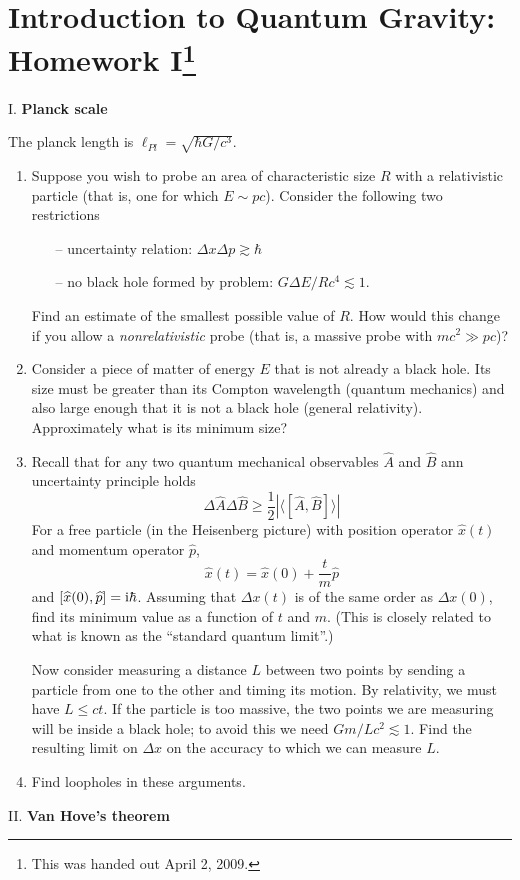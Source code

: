 \section[Homework I]{Introduction to Quantum Gravity: Homework I\footnote{This was handed out April 2, 2009.}}


I. \textbf{Planck scale}

The planck length is $\ell_{Pl} = \sqrt{\hbar G/c^{3}}$.
\begin{enumerate}[label=(\alph*),nosep]
\item Suppose you wish to probe an area of characteristic size $R$ with
  a relativistic particle (that is, one for which $E\sim pc$). Consider
  the following two restrictions
  \begin{itemize}
  \item[--] uncertainty relation: $\Delta x\Delta p\gtrsim\hbar$
  \item[--] no black hole formed by problem: $G\Delta E/R c^{4}\lesssim 1$.
  \end{itemize}
  Find an estimate of the smallest possible value of $R$. How would this
  change if you allow a \emph{nonrelativistic} probe (that is, a massive
  probe with $mc^{2}\gg pc$)?
\item Consider a piece of matter of energy $E$ that is not already a
  black hole. Its size must be greater than its Compton wavelength
  (quantum mechanics) and also large enough that it is not a black hole
  (general relativity). Approximately what is its minimum size?
\item Recall that for any two quantum mechanical observables
  $\widehat{A}$ and $\widehat{B}$ ann uncertainty principle holds
  \begin{equation*}
\Delta\widehat{A}\Delta\widehat{B}\geq\frac{1}{2}|\langle[\widehat{A},\widehat{B}]\rangle|
  \end{equation*}
  For a free particle (in the Heisenberg picture) with position operator
  $\widehat{x}(t)$ and momentum operator $\widehat{p}$,
  \begin{equation*}
    \widehat{x}(t) = \widehat{x}(0) + \frac{t}{m}\widehat{p}
  \end{equation*}
  and $[\widehat{x}(0),\widehat{p}]=\mathrm{i}\hbar$. Assuming that $\Delta x(t)$
  is of the same order as $\Delta x(0)$, find its minimum value as a
  function of $t$ and $m$. (This is closely related to what is known as
  the ``standard quantum limit''.)

  Now consider measuring a distance $L$ between two points by sending a
  particle from one to the other and timing its motion. By relativity,
  we must have $L\leq ct$. If the particle is too massive, the two
  points we are measuring will be inside a black hole; to avoid this we
  need $Gm/Lc^{2}\lesssim1$. Find the resulting limit on $\Delta x$
  on the accuracy to which we can measure $L$.
\item Find loopholes in these arguments.
\end{enumerate}
\medbreak\noindent{}II. \textbf{Van Hove's theorem}\medbreak

